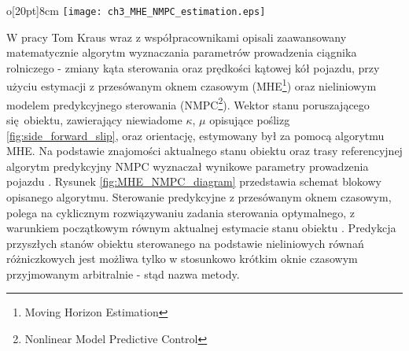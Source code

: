 \begin{wrapfigure}[15]{o}[20pt]{8cm}
	\centering
	\texttt{[image: ch3\_MHE\_NMPC\_estimation.eps]}
	\caption{\textit{Schemat blokowy zaawansowanego algorytmu prowadzenia pojazdu dostosowanego do występowania poślizgu kół.}
	źródło \cite[][strona 30]{KRAUS}}
	\label{fig:MHE_NMPC_diagram}
\end{wrapfigure}
\indent W pracy \cite[]{KRAUS} Tom Kraus wraz z współpracownikami opisali zaawansowany matematycznie algorytm wyznaczania parametrów prowadzenia 
ciągnika rolniczego - zmiany kąta sterowania oraz prędkości kątowej kół pojazdu, przy użyciu estymacji z przesówanym oknem czasowym (MHE\footnote{
Moving Horizon Estimation}) oraz nieliniowym modelem predykcyjnego sterowania (NMPC\footnote{Nonlinear Model Predictive Control}).
Wektor stanu poruszającego się obiektu, zawierający niewiadome $\kappa$, $\mu$ opisujące poślizg \ref{fig:side_forward_slip}, oraz orientację,
estymowany był za pomocą algorytmu MHE. Na podstawie znajomości aktualnego stanu obiektu oraz trasy referencyjnej algorytm predykcyjny NMPC wyznaczał wynikowe parametry 
prowadzenia pojazdu \cite[][strona 30]{KRAUS}. Rysunek \ref{fig:MHE_NMPC_diagram} przedstawia schemat blokowy opisanego algorytmu. 
Sterowanie predykcyjne z przesówanym oknem czasowym, polega na cyklicznym rozwiązywaniu zadania sterowania optymalnego, z warunkiem początkowym 
równym aktualnej estymacie stanu obiektu \cite[][strona 2]{BANIA}. Predykcja przyszłych stanów obiektu sterowanego na podstawie nieliniowych równań różniczkowych jest możliwa 
tylko w stosunkowo krótkim oknie czasowym przyjmowanym arbitralnie - stąd nazwa metody.

